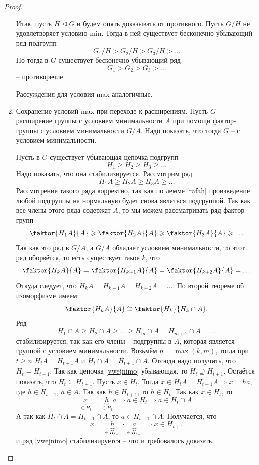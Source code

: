 \documentclass{article}
\begin{document}
\begin{proof}
\begin{enumerate}
        Итак, пусть $H \trianglelefteq G$ и будем опять доказывать от противного. Пусть $G / H$ не удовлетворяет условию min. Тогда в ней существует бесконечно убывающий ряд подгрупп
        \[
            G_1 / H > G_2 / H > G_3 / H > \ldots
        \]
        Но тогда в $G$ существует бесконечно убывающий ряд $$ G_1 > G_2 > G_3 > \ldots $$ -- противоречие.

        Рассуждения для условия max аналогичные.

        \item Сохранение условий max при переходе к расширениям. Пусть $G$ -- расширение группы с условием минимальности $A$ при помощи фактор-группы с условием минимальности $G/A$. Надо показать, что тогда $G$ -- с условием минимальности.

        Пусть в $G$ существует убывающая цепочка подгрупп
        \begin{equation} \tag{*} \label{vwejnimo}
            H_1 \geqslant H_2 \geqslant H_3 \geqslant \ldots
        \end{equation}
        Надо показать, что она стабилизируется.
        Рассмотрим ряд
        \[
            H_1 A \geqslant H_2 A \geqslant H_3 A \geqslant \ldots
        \]
        Рассмотрение такого ряда корректно, так как по лемме \ref{rafah} произведение любой подгруппы на нормальную будет снова являться подгруппой.
        Так как все члены этого ряда содержат $A$, то мы можем рассматривать ряд фактор-групп
        \[
            \faktor{H_1 A}{A} \geqslant \faktor{H_2 A}{A} \geqslant \faktor{H_3 A}{A} \geqslant \ldots
        \]
        Так как это ряд в $G/A$, а $G /A$ обладает условием минимальности, то этот ряд оборвётся, то есть существует такое $k$, что
        \[
            \faktor{H_k A}{A} = \faktor{H_{k + 1} A}{A} = \faktor{H_{k + 2} A}{A} = \ldots
        \]
        Откуда следует, что $H_k A = H_{k + 1} A = H_{k + 2} A = \ldots$.
        По второй теореме об изоморфизме имеем:
        \[
            \faktor{H_k A}{A} \cong \faktor{H_k}{H_k \cap A}.
        \]
        Ряд $$ H_1 \cap A \geqslant H_2 \cap A \geqslant \ldots \geqslant H_m \cap A = H_{m + 1} \cap A = \ldots $$ стабилизируется, так как его члены -- подгруппы в $A$, которая является группой с условием минимальности.
        Возьмём $n = \max(k, m)$, тогда при $t \geqslant n$ $H_t A = H_{t + 1} A$ и $H_t \cap A = H_{t + 1} \cap A$. Отсюда надо получить, что $H_t = H_{t + 1}$. Так как цепочка \eqref{vwejnimo} убывающая, то $H_t \supseteq H_{t + 1}$. Остаётся показать, что $H_t \subseteq H_{t + 1}$.
        Пусть $x \in H_t$. Тогда $x \in H_t A = H_{t + 1} A \Rightarrow x = ha$, где $h \in H_{t + 1}$, $a \in A$. Так как $h \in H_{t + 1}$, то $h \in H_t$. Так как $x \in H_t$, то
        \[
            \underbrace{x}_{\in H_t} = \underbrace{h}_{\in H_t} a \Rightarrow a \in H_t \Rightarrow a \in H_t \cap A.
        \]
        А так как $H_t \cap A = H_{t + 1} \cap A$, то $a \in H_{t + 1} \cap A$. Получается, что $$ x = \underbrace{h}_{\in H_{t + 1}} \cdot \underbrace{a}_{\in H_{t + 1}} \Rightarrow x \in H_{t + 1} $$
        и ряд \eqref{vwejnimo} стабилизируется -- что и требовалось доказать.


\end{enumerate}
\end{proof}
\end{document}
